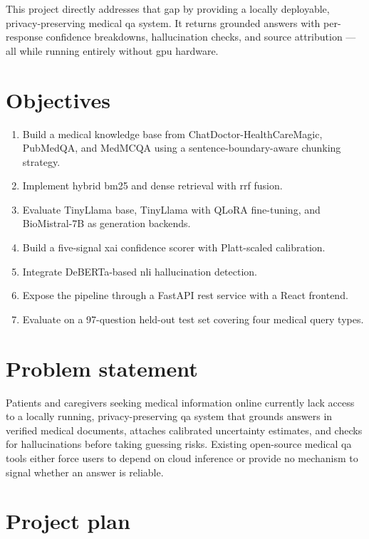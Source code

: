 This project directly addresses that gap by providing a locally deployable, privacy-preserving medical \ac{qa} system. It returns grounded answers with per-response confidence breakdowns, hallucination checks, and source attribution --- all while running entirely without \ac{gpu} hardware.

\section{Objectives}

\begin{enumerate}
    \item Build a medical knowledge base from ChatDoctor-HealthCareMagic, PubMedQA, and MedMCQA using a sentence-boundary-aware chunking strategy.
    \item Implement hybrid \ac{bm25} and dense retrieval with \ac{rrf} fusion.
    \item Evaluate TinyLlama base, TinyLlama with QLoRA fine-tuning, and BioMistral-7B as generation backends.
    \item Build a five-signal \ac{xai} confidence scorer with Platt-scaled calibration.
    \item Integrate DeBERTa-based \ac{nli} hallucination detection.
    \item Expose the pipeline through a FastAPI \ac{rest} service with a React frontend.
    \item Evaluate on a 97-question held-out test set covering four medical query types.
\end{enumerate}

\section{Problem statement}

Patients and caregivers seeking medical information online currently lack access to a locally running, privacy-preserving \ac{qa} system that grounds answers in verified medical documents, attaches calibrated uncertainty estimates, and checks for hallucinations before taking guessing risks. Existing open-source medical \ac{qa} tools either force users to depend on cloud inference or provide no mechanism to signal whether an answer is reliable.

\section{Project plan}

